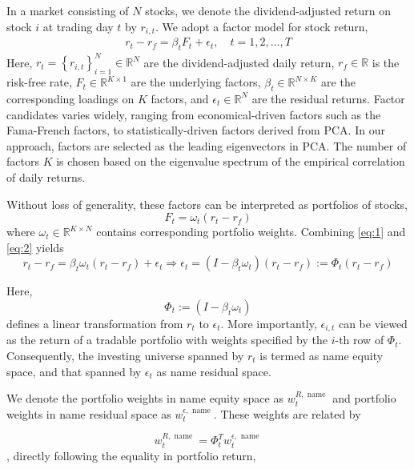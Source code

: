 \documentclass[12pt,article]{memoir}
\begin{document}
In a market consisting of $N$ stocks, we denote the dividend-adjusted return on stock $i$ at trading day $t$ by $r_{i, t}$. We adopt a factor model for stock return,
\begin{align}\label{eq:1}
r_t-r_f=\beta_t F_t+\epsilon_t, \quad t=1,2, \ldots, T 
\end{align}
Here, $r_t=\left\{r_{i, t}\right\}_{i=1}^N \in \mathbb{R}^N$ are the dividend-adjusted daily return, $r_f \in \mathbb{R}$ is the risk-free rate, $F_t \in \mathbb{R}^{K \times 1}$ are the underlying factors, $\beta_t \in \mathbb{R}^{N \times K}$ are the corresponding loadings on $K$ factors, and $\epsilon_t \in \mathbb{R}^N$ are the residual returns. Factor candidates varies widely, ranging from economical-driven factors such as the Fama-French factors, to statistically-driven factors derived from PCA. In our approach, factors are selected as the leading eigenvectors in PCA. The number of factors $K$ is chosen based on the eigenvalue spectrum of the empirical correlation of daily returns.


Without loss of generality, these factors can be interpreted as portfolios of stocks,
\begin{equation}\label{eq:2}
	F_t=\omega_t\left(r_t-r_f\right)
\end{equation}
where $\omega_t \in \mathbb{R}^{K \times N}$ contains corresponding portfolio weights. Combining \cref{eq:1} and \cref{eq:2} yields
\begin{equation}\label{eq:3}
	r_t-r_f=\beta_t \omega_t\left(r_t-r_f\right)+\epsilon_t \Rightarrow \epsilon_t=\left(I-\beta_t \omega_t\right)\left(r_t-r_f\right):=\Phi_t\left(r_t-r_f\right)
\end{equation}

Here,
\begin{equation}\label{eq:4}
	\Phi_t:=\left(I-\beta_t \omega_t\right)
\end{equation}
defines a linear transformation from $r_t$ to $\epsilon_t$. More importantly, $\epsilon_{i, t}$ can be viewed as the return of a tradable portfolio with weights specified by the $i$-th row of $\Phi_t$. Consequently, the investing universe spanned by $r_t$ is termed as name equity space, and that spanned by $\epsilon_t$ as name residual space.

We denote the portfolio weights in name equity space as $w_t^{R, \text { name }}$ and portfolio weights in name residual space as $w_t^{\epsilon, \text { name }}$. These weights are related by

\begin{equation}\label{eq:5}
	w_t^{R, \text { name }}=\Phi_t^T w_t^{\epsilon, \text { name }}
\end{equation}
, directly following the equality in portfolio return,
\end{document}
